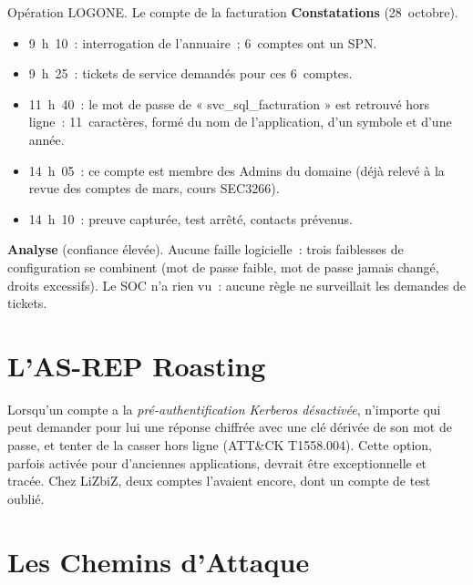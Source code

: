 \begin{boxscenario}{Opération LOGONE. Le compte de la facturation}
\textbf{Constatations} (28~octobre).
\begin{itemize}
    \item 9~h~10~: interrogation de l'annuaire~; 6~comptes ont un SPN.
    \item 9~h~25~: tickets de service demandés pour ces 6~comptes.
    \item 11~h~40~: le mot de passe de « svc\_sql\_facturation » est retrouvé
          hors ligne~: 11~caractères, formé du nom de l'application, d'un
          symbole et d'une année.
    \item 14~h~05~: ce compte est membre des Admins du domaine (déjà relevé
          à la revue des comptes de mars, cours SEC3266).
    \item 14~h~10~: preuve capturée, test arrêté, contacts prévenus.
\end{itemize}

\medskip
\textbf{Analyse} (confiance élevée). Aucune faille logicielle~: trois
faiblesses de configuration se combinent (mot de passe faible, mot de passe
jamais changé, droits excessifs). Le SOC n'a rien vu~: aucune règle ne
surveillait les demandes de tickets.
\end{boxscenario}

\section{L'AS-REP Roasting}
\label{sec:c10-asrep}

Lorsqu'un compte a la \emph{pré-authentification Kerberos désactivée},
n'importe qui peut demander pour lui une réponse chiffrée avec une clé
dérivée de son mot de passe, et tenter de la casser hors ligne (ATT\&CK
T1558.004). Cette option, parfois activée pour d'anciennes applications,
devrait être exceptionnelle et tracée. Chez LiZbiZ, deux comptes l'avaient
encore, dont un compte de test oublié.

\section{Les Chemins d'Attaque}
\label{sec:c10-chemins}

